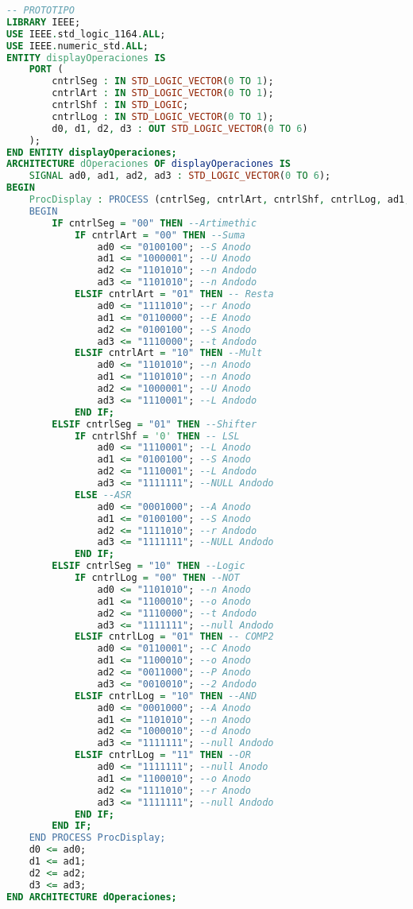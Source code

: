 \begin{lstlisting}[language={vhdl}, caption={Display Operaciones (Prototipo)}, label={Script}]
-- PROTOTIPO
LIBRARY IEEE;
USE IEEE.std_logic_1164.ALL;
USE IEEE.numeric_std.ALL;
ENTITY displayOperaciones IS
    PORT (
        cntrlSeg : IN STD_LOGIC_VECTOR(0 TO 1);
        cntrlArt : IN STD_LOGIC_VECTOR(0 TO 1);
        cntrlShf : IN STD_LOGIC;
        cntrlLog : IN STD_LOGIC_VECTOR(0 TO 1);
        d0, d1, d2, d3 : OUT STD_LOGIC_VECTOR(0 TO 6)
    );
END ENTITY displayOperaciones;
ARCHITECTURE dOperaciones OF displayOperaciones IS
    SIGNAL ad0, ad1, ad2, ad3 : STD_LOGIC_VECTOR(0 TO 6);
BEGIN
    ProcDisplay : PROCESS (cntrlSeg, cntrlArt, cntrlShf, cntrlLog, ad1, ad2, ad0, ad3)
    BEGIN
        IF cntrlSeg = "00" THEN --Artimethic
            IF cntrlArt = "00" THEN --Suma
                ad0 <= "0100100"; --S Anodo
                ad1 <= "1000001"; --U Anodo
                ad2 <= "1101010"; --n Andodo
                ad3 <= "1101010"; --n Andodo
            ELSIF cntrlArt = "01" THEN -- Resta
                ad0 <= "1111010"; --r Anodo
                ad1 <= "0110000"; --E Anodo
                ad2 <= "0100100"; --S Anodo
                ad3 <= "1110000"; --t Andodo
            ELSIF cntrlArt = "10" THEN --Mult
                ad0 <= "1101010"; --n Anodo
                ad1 <= "1101010"; --n Anodo
                ad2 <= "1000001"; --U Anodo
                ad3 <= "1110001"; --L Andodo
            END IF;
        ELSIF cntrlSeg = "01" THEN --Shifter
            IF cntrlShf = '0' THEN -- LSL
                ad0 <= "1110001"; --L Anodo
                ad1 <= "0100100"; --S Anodo
                ad2 <= "1110001"; --L Andodo
                ad3 <= "1111111"; --NULL Andodo
            ELSE --ASR
                ad0 <= "0001000"; --A Anodo
                ad1 <= "0100100"; --S Anodo
                ad2 <= "1111010"; --r Andodo
                ad3 <= "1111111"; --NULL Andodo
            END IF;
        ELSIF cntrlSeg = "10" THEN --Logic
            IF cntrlLog = "00" THEN --NOT
                ad0 <= "1101010"; --n Anodo
                ad1 <= "1100010"; --o Anodo
                ad2 <= "1110000"; --t Andodo
                ad3 <= "1111111"; --null Andodo
            ELSIF cntrlLog = "01" THEN -- COMP2
                ad0 <= "0110001"; --C Anodo
                ad1 <= "1100010"; --o Anodo
                ad2 <= "0011000"; --P Anodo
                ad3 <= "0010010"; --2 Andodo
            ELSIF cntrlLog = "10" THEN --AND
                ad0 <= "0001000"; --A Anodo
                ad1 <= "1101010"; --n Anodo
                ad2 <= "1000010"; --d Anodo
                ad3 <= "1111111"; --null Andodo
            ELSIF cntrlLog = "11" THEN --OR
                ad0 <= "1111111"; --null Anodo
                ad1 <= "1100010"; --o Anodo
                ad2 <= "1111010"; --r Anodo
                ad3 <= "1111111"; --null Andodo
            END IF;
        END IF;
    END PROCESS ProcDisplay;
    d0 <= ad0;
    d1 <= ad1;
    d2 <= ad2;
    d3 <= ad3;
END ARCHITECTURE dOperaciones;
	\end{lstlisting}